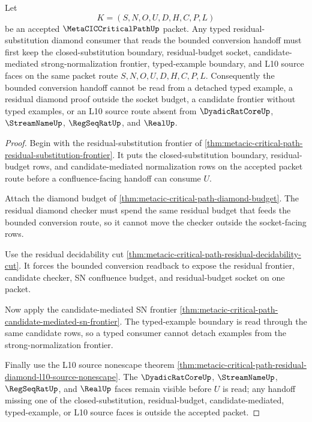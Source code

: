 \begin{theorem}
\label{thm:metacic-residual-substitution-diamond-budget-typed-boundary}
Let
$$
K=(S,N,O,U,D,H,C,P,L)
$$
be an accepted $\MetaCICCriticalPathUp$ packet. Any typed residual-substitution diamond consumer that reads the bounded conversion handoff must first keep the closed-substitution boundary, residual-budget socket, candidate-mediated strong-normalization frontier, typed-example boundary, and L10 source faces on the same packet route $S,N,O,U,D,H,C,P,L$. Consequently the bounded conversion handoff cannot be read from a detached typed example, a residual diamond proof outside the socket budget, a candidate frontier without typed examples, or an L10 source route absent from $\DyadicRatCoreUp$, $\StreamNameUp$, $\RegSeqRatUp$, and $\RealUp$.
\end{theorem}
\begin{proof}
Begin with the residual-substitution frontier of \autoref{thm:metacic-critical-path-residual-substitution-frontier}. It puts the closed-substitution boundary, residual-budget rows, and candidate-mediated normalization rows on the accepted packet route before a confluence-facing handoff can consume $U$.

Attach the diamond budget of \autoref{thm:metacic-critical-path-diamond-budget}. The residual diamond checker must spend the same residual budget that feeds the bounded conversion route, so it cannot move the checker outside the socket-facing rows.

Use the residual decidability cut \autoref{thm:metacic-critical-path-residual-decidability-cut}. It forces the bounded conversion readback to expose the residual frontier, candidate checker, SN confluence budget, and residual-budget socket on one packet.

Now apply the candidate-mediated SN frontier \autoref{thm:metacic-critical-path-candidate-mediated-sn-frontier}. The typed-example boundary is read through the same candidate rows, so a typed consumer cannot detach examples from the strong-normalization frontier.

Finally use the L10 source nonescape theorem \autoref{thm:metacic-critical-path-residual-diamond-l10-source-nonescape}. The $\DyadicRatCoreUp$, $\StreamNameUp$, $\RegSeqRatUp$, and $\RealUp$ faces remain visible before $U$ is read; any handoff missing one of the closed-substitution, residual-budget, candidate-mediated, typed-example, or L10 source faces is outside the accepted packet.
\end{proof}
